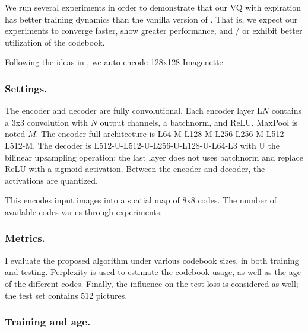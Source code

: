We run several experiments in order to demonstrate that our VQ with expiration has better training dynamics than the vanilla version of \citet{vqvae}. That is, we expect our experiments to converge faster, show greater performance, and / or exhibit better utilization of the codebook.

Following the ideas in \citet{vqvae}, we auto-encode 128x128 Imagenette \citep{imagenette}.

\subsubsection{Settings.}

The encoder and decoder are fully convolutional. Each encoder layer L$N$ contains a 3x3 convolution with $N$ output channels, a batchnorm, and ReLU. MaxPool is noted $M$. The encoder full architecture is L64-M-L128-M-L256-L256-M-L512-L512-M. The decoder is L512-U-L512-U-L256-U-L128-U-L64-L3 with U the bilinear upsampling operation; the last layer does not uses batchnorm and replace ReLU with a sigmoid activation. Between the encoder and decoder, the activations are quantized.

This encodes input images into a spatial map of 8x8 codes. The number of available codes varies through experiments.

\subsubsection{Metrics.}

I evaluate the proposed algorithm under various codebook sizes, in both training and testing. Perplexity is used to estimate the codebook usage, as well as the age of the different codes. Finally, the influence on the test loss is considered as well; the test set contains 512 pictures.

\subsubsection{Training and age.}

